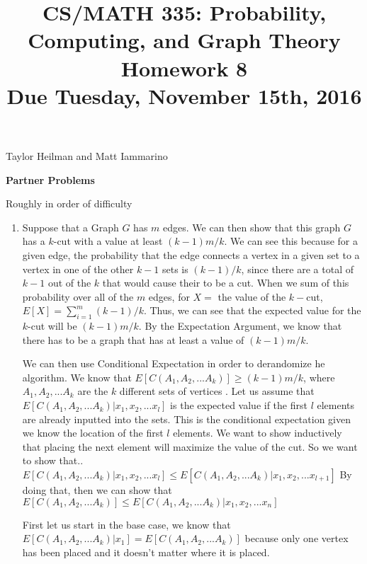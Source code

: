 \documentclass[11pt]{amsart}
\begin{document}
\title[CS/MATH 335 HW 8]{CS/MATH 335: Probability, Computing, and Graph Theory \\ Homework 8\\ Due Tuesday, November 15th, 2016}
\maketitle

{Taylor Heilman and Matt Iammarino}

\textbf{Partner Problems}

Roughly in order of difficulty

\begin{enumerate}

\item {} 
{

Suppose that a Graph $G$ has $m$ edges. We can then show that this graph $G$ has a $k$-cut with a value at least $(k-1)m/k$.
We can see this because for a given edge, the probability that the edge connects a vertex in a given set to a vertex in one of the other $k-1$ sets is $(k-1)/k$, since there are a total of $k-1$ out of the $k$ that would cause their to be a cut. When we sum of this probability over all of the $m$ edges, for $X= $ the value of the $k-$cut, $E[X] = \sum_{i =1}^{m} (k-1)/k$. Thus, we can see that the expected value for the $k$-cut will be $(k-1)m/k$. By the Expectation Argument, we know that there has to be a graph that has at least a value of $(k-1)m/k$. 


We can then use Conditional Expectation in order to derandomize he algorithm. We know that $E[C(A_1,A_2,...A_k)] \geq (k-1)m/k$, where $A_1,A_2,...A_k$ are the $k$ different sets of vertices . Let us assume that $E[C(A_1,A_2,...A_k) | x_1,x_2,...x_l]$ is the expected value if the first $l$ elements are already inputted into the sets. This is the conditional expectation given we know the location of the first $l$ elements. We want to show inductively that placing the next element will maximize the value of the cut. So we want to show that.. \newline
$E[C(A_1,A_2,...A_k) | x_1,x_2,...x_l] \leq E[C(A_1,A_2,...A_k) | x_1,x_2,...x_{l+1}]$\newline
By doing that, then we can show that $E[C(A_1,A_2,...A_k)] \leq E[C(A_1,A_2,...A_k) | x_1,x_2,...x_n]$\newline

First let us start in the base case, we know that 
$E[C(A_1,A_2,...A_k) | x_1] = E[C(A_1,A_2,...A_k)]$ because only one vertex has been placed and it doesn't matter where it is placed. \newline

}
\end{enumerate}
\end{document}
